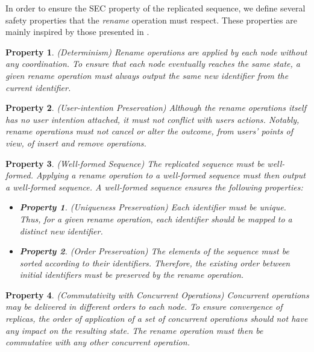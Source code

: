\documentclass[10pt,journal,compsoc]{IEEEtran}
\newtheorem{property}{Property}
\newtheorem{subproperty}{Property}[property]
\begin{document}
In order to ensure the \ac{SEC} property of the replicated sequence, we define several safety properties that the \emph{rename} operation must respect.
These properties are mainly inspired by those presented in \cite{zawirski:hal-01248197}.

\begin{property}(Determinism)
    \label{prop:determinism}
    \emph{Rename} operations are applied by each node without any coordination.
    To ensure that each node eventually reaches the same state, a given \emph{rename} operation must always output the same new identifier from the current identifier.
\end{property}

\begin{property}(User-intention Preservation)
    \label{prop:intention}
    Although the \emph{rename} operations itself has no user intention attached, it must not conflict with users actions.
    Notably, \emph{rename} operations must not cancel or alter the outcome, from users' points of view, of \emph{insert} and \emph{remove} operations.
\end{property}

\begin{property}(Well-formed Sequence)
    The replicated sequence must be well-formed.
    Applying a \emph{rename} operation to a well-formed sequence must then output a well-formed sequence.
    A well-formed sequence ensures the following properties:
    \begin{itemize}[noitemsep]
        \item[~]
        \begin{subproperty}(Uniqueness Preservation)
            \label{prop:uniqueness}
            Each identifier must be unique.
            Thus, for a given \emph{rename} operation, each identifier should be mapped to a distinct new identifier.
        \end{subproperty}
        \item[~]
        \begin{subproperty}(Order Preservation)
            \label{prop:order}
            The elements of the sequence must be sorted according to their identifiers.
            Therefore, the existing order between initial identifiers must be preserved by the \emph{rename} operation.
        \end{subproperty}
    \end{itemize}
\end{property}

\begin{property}(Commutativity with Concurrent Operations)
    \label{prop:commutativity}
    Concurrent operations may be delivered in different orders to each node.
    To ensure convergence of replicas, the order of application of a set of concurrent operations should not have any impact on the resulting state.
    The \emph{rename} operation must then be commutative with any other concurrent operation.
\end{property}
\end{document}
